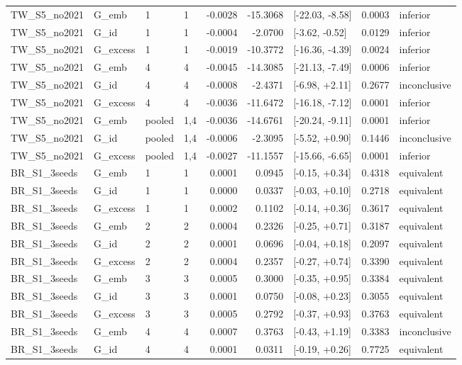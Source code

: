 \begin{tabular}{llllrrlrl}
TW\_S5\_no2021 & G\_emb & 1 & 1 & -0.0028 & -15.3068 & [-22.03, -8.58] & 0.0003 & inferior \\
TW\_S5\_no2021 & G\_id & 1 & 1 & -0.0004 & -2.0700 & [-3.62, -0.52] & 0.0129 & inferior \\
TW\_S5\_no2021 & G\_excess & 1 & 1 & -0.0019 & -10.3772 & [-16.36, -4.39] & 0.0024 & inferior \\
TW\_S5\_no2021 & G\_emb & 4 & 4 & -0.0045 & -14.3085 & [-21.13, -7.49] & 0.0006 & inferior \\
TW\_S5\_no2021 & G\_id & 4 & 4 & -0.0008 & -2.4371 & [-6.98, +2.11] & 0.2677 & inconclusive \\
TW\_S5\_no2021 & G\_excess & 4 & 4 & -0.0036 & -11.6472 & [-16.18, -7.12] & 0.0001 & inferior \\
TW\_S5\_no2021 & G\_emb & pooled & 1,4 & -0.0036 & -14.6761 & [-20.24, -9.11] & 0.0001 & inferior \\
TW\_S5\_no2021 & G\_id & pooled & 1,4 & -0.0006 & -2.3095 & [-5.52, +0.90] & 0.1446 & inconclusive \\
TW\_S5\_no2021 & G\_excess & pooled & 1,4 & -0.0027 & -11.1557 & [-15.66, -6.65] & 0.0001 & inferior \\
BR\_S1\_3seeds & G\_emb & 1 & 1 & 0.0001 & 0.0945 & [-0.15, +0.34] & 0.4318 & equivalent \\
BR\_S1\_3seeds & G\_id & 1 & 1 & 0.0000 & 0.0337 & [-0.03, +0.10] & 0.2718 & equivalent \\
BR\_S1\_3seeds & G\_excess & 1 & 1 & 0.0002 & 0.1102 & [-0.14, +0.36] & 0.3617 & equivalent \\
BR\_S1\_3seeds & G\_emb & 2 & 2 & 0.0004 & 0.2326 & [-0.25, +0.71] & 0.3187 & equivalent \\
BR\_S1\_3seeds & G\_id & 2 & 2 & 0.0001 & 0.0696 & [-0.04, +0.18] & 0.2097 & equivalent \\
BR\_S1\_3seeds & G\_excess & 2 & 2 & 0.0004 & 0.2357 & [-0.27, +0.74] & 0.3390 & equivalent \\
BR\_S1\_3seeds & G\_emb & 3 & 3 & 0.0005 & 0.3000 & [-0.35, +0.95] & 0.3384 & equivalent \\
BR\_S1\_3seeds & G\_id & 3 & 3 & 0.0001 & 0.0750 & [-0.08, +0.23] & 0.3055 & equivalent \\
BR\_S1\_3seeds & G\_excess & 3 & 3 & 0.0005 & 0.2792 & [-0.37, +0.93] & 0.3763 & equivalent \\
BR\_S1\_3seeds & G\_emb & 4 & 4 & 0.0007 & 0.3763 & [-0.43, +1.19] & 0.3383 & inconclusive \\
BR\_S1\_3seeds & G\_id & 4 & 4 & 0.0001 & 0.0311 & [-0.19, +0.26] & 0.7725 & equivalent \\

\end{tabular}
